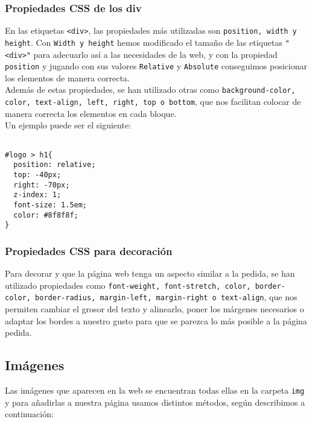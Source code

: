 \documentclass[10pt,a4paper]{article}
\begin{document}
\subsubsection{Propiedades CSS de los div}

En las etiquetas \texttt{<div>}, las propiedades más utilizadas son \texttt{position, width y height}. Con \texttt{Width y height} hemos modificado el tamaño de las etiquetas \texttt{"<div>"} para adecuarlo así a las necesidades de la web, y con la propiedad \texttt{position} y jugando con sus valores \texttt{Relative} y \texttt{Absolute} conseguimos posicionar los elementos de manera correcta.\\

Además de estas propiedades, se han utilizado otras como \texttt{background-color, color, text-align, left, right, top o bottom}, que nos facilitan colocar de manera correcta los elementos en cada bloque.\\

Un ejemplo puede ser el siguiente:

\begin{verbatim}

#logo > h1{
  position: relative;
  top: -40px;
  right: -70px;
  z-index: 1;
  font-size: 1.5em;
  color: #8f8f8f;
}

\end{verbatim}

\subsubsection{Propiedades CSS para decoración}

Para decorar y que la página web tenga un aspecto similar a la pedida, se han utilizado propiedades como \texttt{font-weight, font-stretch, color, border-color, border-radius, margin-left, margin-right o text-align}, que nos permiten cambiar el grosor del texto y alinearlo, poner los márgenes necesarios o adaptar los bordes a nuestro gusto para que se parezca lo más posible a la página pedida.


\subsection{Imágenes}

Las imágenes que aparecen en la web se encuentran todas ellas en la carpeta \texttt{img} y para añadirlas a nuestra página usamos distintos métodos, según describimos a continuación:\\
\end{document}
